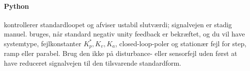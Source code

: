 \paragraph{Python}
 kontrollerer
standardloopet og afviser ustabil slutværdi; signalvejen er stadig manuel.
 bruges,
når standard negativ unity feedback er bekræftet, og du vil have systemtype,
fejlkonstanter \(K_p^\ast,K_v,K_a\), closed-loop-poler og stationær fejl for step,
ramp eller parabel. Brug den ikke på disturbance- eller sensorfejl uden først at have
reduceret signalvejen til den tilsvarende standardform.
